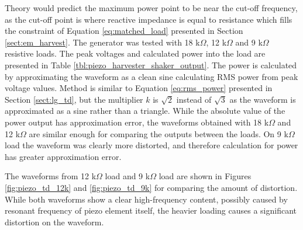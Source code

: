 Theory would predict the maximum power point to be near the cut-off frequency, as the cut-off point is where reactive impedance is equal to resistance which fills the constraint of Equation \eqref{eq:matched_load} presented in Section \ref{sect:em_harvest}. The generator was tested with 18 k$\Omega$, 12 k$\Omega$ and 9 k$\Omega$ resistive loads. The peak voltages and calculated power into the load are presented in Table \ref{tbl:piezo_harvester_shaker_output}. The power is calculated by approximating the waveform as a clean sine calculating RMS power from peak voltage values. Method is similar to Equation \eqref{eq:rms_power} presented in Section \ref{sect:lg_td}, but the multiplier $k$ is $\sqrt{2}$ instead of $\sqrt{3}$ as the waveform is approximated as a sine rather than a triangle. While the absolute value of the power output has approximation error, the waveforms obtained with 18 k$\Omega$ and 12 k$\Omega$ are similar enough for comparing the outputs between the loads. On 9 k$\Omega$ load the waveform was clearly more distorted, and therefore calculation for power has greater approximation error.

\begin{table}[htb]
\caption{\label{tbl:piezo_harvester_shaker_output} Output power of piezo harvester at 18 k$\Omega$, 12 k$\Omega$ and 9 k$\Omega$ loads.}
\begin{center}
\end{center}
\end{table}

The waveforms from 12 k$\Omega$ load and 9 k$\Omega$ load are shown in Figures \ref{fig:piezo_td_12k} and \ref{fig:piezo_td_9k} for comparing the amount of distortion. While both waveforms show a clear high-frequency content, possibly caused by resonant frequency of piezo element itself, the heavier loading causes a significant distortion on the waveform.

